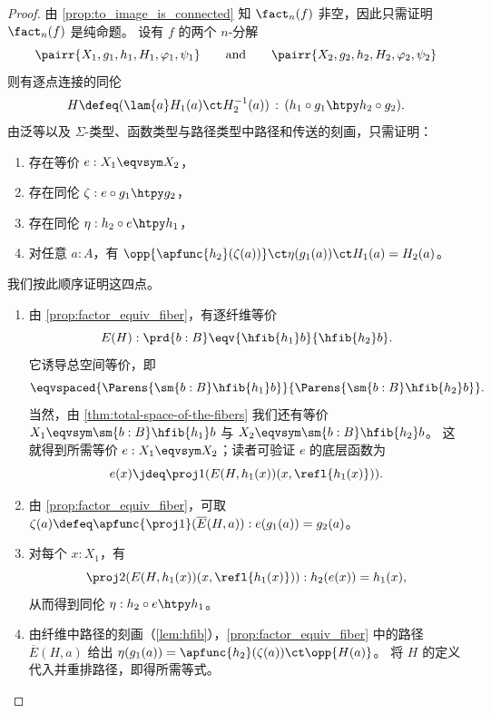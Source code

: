 \begin{proof}
由 \cref{prop:to_image_is_connected} 知 $\fact_n(f)$ 非空，因此只需证明 $\fact_n(f)$ 是纯命题。
设有 $f$ 的两个 $n$-分解
\begin{equation*}
\pairr{X_1,g_1,h_1,H_1,\varphi_1,\psi_1}\qquad\text{and}\qquad\pairr{X_2,g_2,h_2,H_2,\varphi_2,\psi_2}
\end{equation*}
则有逐点连接的同伦
\[ H\defeq (\lam{a} H_1(a) \ct H_2^{-1}(a)) \,:\, (h_1\circ g_1\htpy h_2\circ g_2).\]
由泛等以及 $\Sigma$-类型、函数类型与路径类型中路径和传送的刻画，只需证明：
\begin{enumerate}
\item 存在等价 $e:X_1\eqvsym X_2$，
\item 存在同伦 $\zeta:e\circ g_1\htpy g_2$，
\item 存在同伦 $\eta:h_2\circ e\htpy h_1$，
\item 对任意 $a:A$，有 $\opp{\apfunc{h_2}(\zeta(a))} \ct \eta(g_1(a)) \ct H_1(a) = H_2(a)$。
\end{enumerate}
我们按此顺序证明这四点。
\begin{enumerate}
\item 由 \cref{prop:factor_equiv_fiber}，有逐纤维等价
\begin{equation*}
E(H) : \prd{b:B} \eqv{\hfib{h_1}b}{\hfib{h_2}b}.
\end{equation*}
它诱导总空间等价，即
\begin{equation*}
\eqvspaced{\Parens{\sm{b:B} \hfib{h_1}b}}{\Parens{\sm{b:B}\hfib{h_2}b}}.
\end{equation*}
当然，由 \cref{thm:total-space-of-the-fibers} 我们还有等价 $X_1\eqvsym\sm{b:B}\hfib{h_1}b$ 与 $X_2\eqvsym\sm{b:B}
\hfib{h_2}b$。
这就得到所需等价 $e:X_1\eqvsym X_2$；读者可验证 $e$ 的底层函数为
\begin{equation*}
e(x) \jdeq \proj1(E(H,h_1(x))(x,\refl{h_1(x)})).
\end{equation*}
\item 由 \cref{prop:factor_equiv_fiber}，可取
  $\zeta(a) \defeq \apfunc{\proj1}(\overline E(H,a)) : e(g_1(a)) = g_2(a)$。
  \label{item:orth-fact-2}
\item 对每个 $x:X_1$，有
\begin{equation*}
\proj2(E(H,h_1(x))({x,\refl{h_1(x)}})) :h_2(e(x))= h_1(x),
\end{equation*}
从而得到同伦 $\eta:h_2\circ e\htpy h_1$。
\item 由纤维中路径的刻画（\cref{lem:hfib}），\cref{prop:factor_equiv_fiber} 中的路径 $\overline E(H,a)$ 给出
  $\eta(g_1(a)) = \apfunc{h_2}(\zeta(a)) \ct \opp{H(a)}$。
  将 $H$ 的定义代入并重排路径，即得所需等式。\qedhere
\end{enumerate}
\end{proof}

